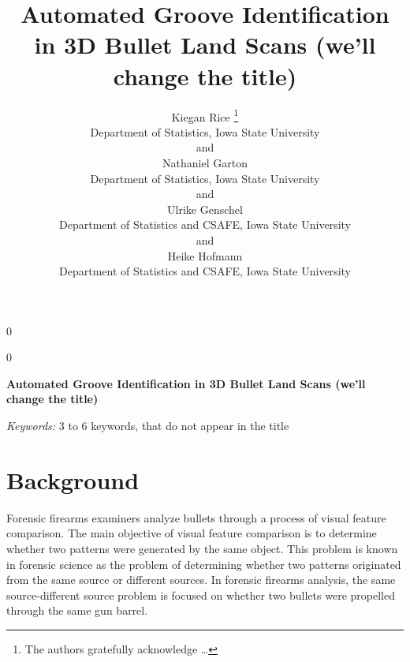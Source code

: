 \documentclass[12pt]{article}
\newcommand{\blind}{0}
\begin{document}
\def\spacingset#1{\renewcommand{\baselinestretch}%
{#1}\small\normalsize} \spacingset{1}




\blind
{
  \title{\bf Automated Groove Identification in 3D Bullet Land Scans (we'll change
the title)}

  \author{
        Kiegan Rice \thanks{The authors gratefully acknowledge \ldots{}} \\
    Department of Statistics, Iowa State University\\
     and \\     Nathaniel Garton \\
    Department of Statistics, Iowa State University\\
     and \\     Ulrike Genschel \\
    Department of Statistics and CSAFE, Iowa State University\\
     and \\     Heike Hofmann \\
    Department of Statistics and CSAFE, Iowa State University\\
      }
  \maketitle
} \fi

\blind
{
  \bigskip
  \bigskip
  \bigskip
  \begin{center}
    {\LARGE\bf Automated Groove Identification in 3D Bullet Land Scans (we'll change
the title)}
  \end{center}
  \medskip
} \fi

\bigskip
\begin{abstract}

\end{abstract}

\noindent%
{\it Keywords:} 3 to 6 keywords, that do not appear in the title
\vfill

\newpage
\spacingset{1.45} %

\section{Background}

Forensic firearms examiners analyze bullets through a process of visual
feature comparison. The main objective of visual feature comparison is
to determine whether two patterns were generated by the same object.
This problem is known in forensic science as the problem of determining
whether two patterns originated from the same source or different
sources. In forensic firearms analysis, the same source-different source
problem is focused on whether two bullets were propelled through the
same gun barrel.
\end{document}
